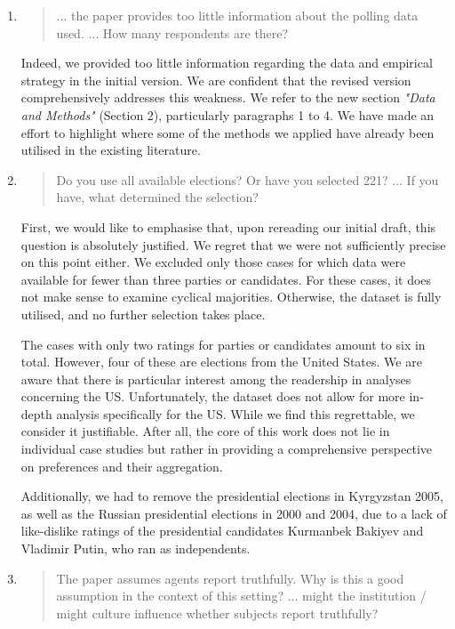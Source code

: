 \documentclass[a4paper, 12pt]{scrartcl}
\begin{document}
\begin{enumerate}[label=(\alph*)] 
	\item
\begin{quote}
$\ldots$ the paper provides too little information about the polling data used. $\ldots$ How many respondents are there?
\end{quote}	
Indeed, we provided too little information regarding the data and empirical strategy in the initial version. We are confident that the revised version comprehensively addresses this weakness. We refer to the new section \textit{"Data and Methods"} (Section 2), particularly paragraphs 1 to 4. We have made an effort to highlight where some of the methods we applied have already been utilised in the existing literature.
\item 
\begin{quote}
	Do you use all available elections? Or have you selected 221? $\ldots$ If you have, what determined the selection?
\end{quote}
First, we would like to emphasise that, upon rereading our initial draft, this question is absolutely justified. We regret that we were not sufficiently precise on this point either. We excluded only those cases for which data were available for fewer than three parties or candidates. For these cases, it does not make sense to examine cyclical majorities. Otherwise, the dataset is fully utilised, and no further selection takes place. 

The cases with only two ratings for parties or candidates amount to six in total. However, four of these are elections from the United States. We are aware that there is particular interest among the readership in analyses concerning the US. Unfortunately, the dataset does not allow for more in-depth analysis specifically for the US. While we find this regrettable, we consider it justifiable. After all, the core of this work does not lie in individual case studies but rather in providing a comprehensive perspective on preferences and their aggregation.

Additionally, we had to remove the presidential elections in Kyrgyzstan 2005, as well as the Russian presidential elections in 2000 and 2004, due to a lack of like-dislike ratings of the presidential candidates Kurmanbek Bakiyev and Vladimir Putin, who ran as independents.
\item \begin{quote}
	The paper assumes agents report truthfully. Why is this a good assumption in the context of this setting? $\ldots$ might the institution / might culture influence whether subjects report truthfully?
\end{quote}


\end{enumerate}
\end{document}
